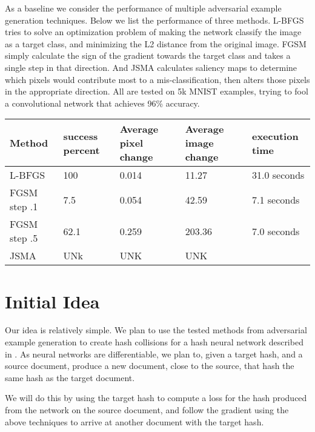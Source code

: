 \documentclass{article}
\begin{document}
As a baseline we consider the performance of multiple adversarial example
generation techniques. Below we list the performance of three methods. L-BFGS
tries to solve an optimization problem of making the network classify the image as
a target class, and minimizing the L2 distance from the original image. FGSM simply
calculate the sign of the gradient towards the target class and takes a single 
step in that direction. And JSMA calculates saliency maps to determine which pixels
would contribute most to a mis-classification, then alters those pixels in the
appropriate direction. All are tested on 5k MNIST examples, trying to fool
a convolutional network that achieves 96\% accuracy.

\begin{tabular}{l | l l l l}
    Method & success percent & Average pixel change & Average image change & execution time\\ \hline
    L-BFGS & 100 & 0.014 & 11.27 & 31.0 seconds \\
    FGSM step .1 & 7.5 & 0.054 & 42.59 & 7.1 seconds \\
    FGSM step .5 & 62.1 & 0.259 & 203.36 & 7.0 seconds \\
    JSMA & UNk & UNK & UNK
\end{tabular}

\section{Initial Idea}

Our idea is relatively simple. We plan to use the tested methods from adversarial example generation to
create hash collisions for a hash neural network described in \cite{hash1}. As neural networks are 
differentiable, we plan to, given a target hash, and a source document, produce a new document, close 
to the source, that hash the same hash as the target document. 

We will do this by using the target hash to compute a loss for the hash produced from the network on the
source document, and follow the gradient using the above techniques to arrive at another document with the
target hash.

 
\end{document}
